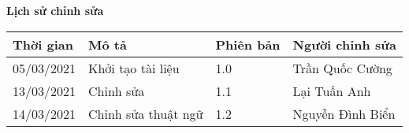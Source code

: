 \documentclass[./main.tex]{subfiles}
\begin{document}
\begin{center}
	\Large{\textbf{Lịch sử chỉnh sửa}}
	\begin{table}[H]
		\begin{tabular}{|p{}|p{}|p{}|p{}|}
			\hline
			\textbf{Thời gian} & \textbf{Mô tả}      & \textbf{Phiên bản} & \textbf{Người chỉnh sửa} \\ \hline
			05/03/2021         & Khởi tạo tài liệu   & 1.0                & Trần Quốc Cường          \\ \hline
			13/03/2021         & Chỉnh sửa           & 1.1                & Lại Tuấn Anh             \\ \hline
			14/03/2021         & Chỉnh sửa thuật ngữ & 1.2                & Nguyễn Đình Biển         \\ \hline
		\end{tabular}
	\end{table}
\end{center}
\end{document}
